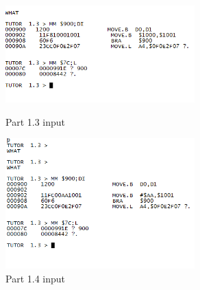 \documentclass{article}
\begin{document}
					
					\begin{figure}[!htb]
					\begin{center}
					\includegraphics[width=0.65\textwidth]{b} 
					\caption{Part 1.3  input}
					\includegraphics[width=0.65\textwidth]{c} 
					\caption{Part 1.4  input}
					\end{center}\end{figure}
					
\FloatBarrier
			


\end{document}
